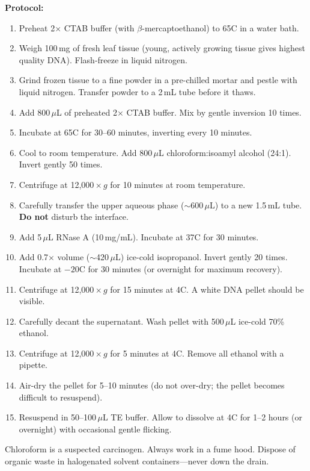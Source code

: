 \begin{protocolbox}[title={Protocol: CTAB DNA Extraction from Plant Tissue}]
\textbf{Protocol:}
\begin{enumerate}[nosep]
  \item Preheat 2$\times$ CTAB buffer (with $\beta$-mercaptoethanol) to 65\textdegree C in a water bath.
  \item Weigh 100\,mg of fresh leaf tissue (young, actively growing tissue gives highest quality DNA). Flash-freeze in liquid nitrogen.
  \item Grind frozen tissue to a fine powder in a pre-chilled mortar and pestle with liquid nitrogen. Transfer powder to a 2\,mL tube before it thaws.
  \item Add 800\,$\mu$L of preheated 2$\times$ CTAB buffer. Mix by gentle inversion 10 times.
  \item Incubate at 65\textdegree C for 30--60 minutes, inverting every 10 minutes.
  \item Cool to room temperature. Add 800\,$\mu$L chloroform:isoamyl alcohol (24:1). Invert gently 50 times.
  \item Centrifuge at 12,000\,$\times$\,$g$ for 10 minutes at room temperature.
  \item Carefully transfer the upper aqueous phase ($\sim$600\,$\mu$L) to a new 1.5\,mL tube. \textbf{Do not} disturb the interface.
  \item Add 5\,$\mu$L RNase A (10\,mg/mL). Incubate at 37\textdegree C for 30 minutes.
  \item Add 0.7$\times$ volume ($\sim$420\,$\mu$L) ice-cold isopropanol. Invert gently 20 times. Incubate at $-20$\textdegree C for 30 minutes (or overnight for maximum recovery).
  \item Centrifuge at 12,000\,$\times$\,$g$ for 15 minutes at 4\textdegree C. A white DNA pellet should be visible.
  \item Carefully decant the supernatant. Wash pellet with 500\,$\mu$L ice-cold 70\% ethanol.
  \item Centrifuge at 12,000\,$\times$\,$g$ for 5 minutes at 4\textdegree C. Remove all ethanol with a pipette.
  \item Air-dry the pellet for 5--10 minutes (do not over-dry; the pellet becomes difficult to resuspend).
  \item Resuspend in 50--100\,$\mu$L TE buffer. Allow to dissolve at 4\textdegree C for 1--2 hours (or overnight) with occasional gentle flicking.
\end{enumerate}
\end{protocolbox}

\begin{warningbox}[title={Chloroform Safety}]
Chloroform is a suspected carcinogen. Always work in a fume hood. Dispose of organic waste in halogenated solvent containers---never down the drain.
\end{warningbox}

